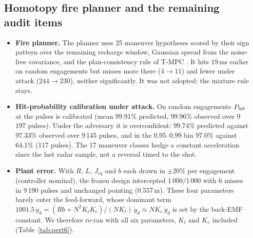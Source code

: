 \subsection{Homotopy fire planner and the remaining audit items}
\begin{itemize}
\item \textbf{Fire planner.} The planner uses 25 maneuver hypotheses scored by their sign pattern over the remaining recharge window, Gaussian spread from the noise-free covariance, and the plan-consistency rule of T-MPC \cite{degroot2024tmpc}. It hits 19\,ms earlier on random engagements but misses more there ($4\to11$) and fewer under attack ($244\to230$), neither significantly. It was not adopted; the mixture rule stays.
\item \textbf{Hit-probability calibration under attack.} On random engagements $P_{\mathrm{hit}}$ at the pulses is calibrated (mean 99.91\% predicted, 99.96\% observed over 9\,197 pulses). Under the adversary it is overconfident: 99.74\% predicted against 97.33\% observed over 9\,145 pulses, and in the 0.95--0.99 bin 97.0\% against 64.1\% (117 pulses). The 17 maneuver classes hedge a constant acceleration since the last radar sample, not a reversal timed to the shot.
\item \textbf{Plant error.} With $R$, $L$, $J_{eq}$ and $b$ each drawn in $\pm20\%$ per engagement (controller nominal), the frozen design intercepted 1\,000/1\,000 with 6 misses in 9\,190 pulses and unchanged pointing (0.557\,m). These four parameters barely enter the feed-forward, whose dominant term $1001.5\,\dot y_d=(Rb+N^2K_tK_e)/(NK_t)\,\dot y_d\approx NK_e\,\dot y_d$ is set by the back-EMF constant. We therefore re-ran with all six parameters, $K_t$ and $K_e$ included (Table~\ref{tab:pert6}).


\end{itemize}
